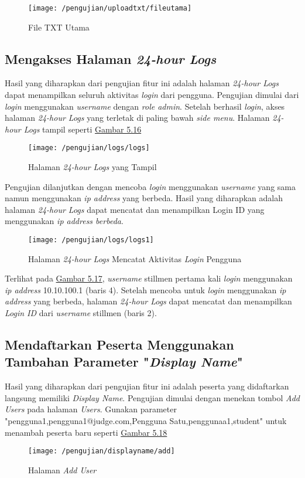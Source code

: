 	\begin{figure}[H]
		\centering  
		\texttt{[image: /pengujian/uploadtxt/fileutama]}  
		\caption[File TXT Utama]{File TXT Utama} 
		\label{fig:fileutama} 
	\end{figure}

	\subsection{Mengakses Halaman \textit{24-hour Logs}}
	Hasil yang diharapkan dari pengujian fitur ini adalah halaman \textit{24-hour Logs} dapat menampilkan seluruh aktivitas \textit{login} dari pengguna. Pengujian dimulai dari \textit{login} menggunakan \textit{username} dengan \textit{role admin}. Setelah berhasil \textit{login}, akses halaman \textit{24-hour Logs} yang terletak di paling bawah \textit{side menu}. Halaman \textit{24-hour Logs} tampil seperti \hyperref[fig:logs]{Gambar 5.16}
	\begin{figure}[H]
		\centering  
		\texttt{[image: /pengujian/logs/logs]}  
		\caption[Halaman \textit{24-hour Logs} yang Tampil]{Halaman \textit{24-hour Logs} yang Tampil} 
		\label{fig:logs} 
	\end{figure}

	Pengujian dilanjutkan dengan mencoba \textit{login} menggunakan \textit{username} yang sama namun menggunakan \textit{ip address} yang berbeda. Hasil yang diharapkan adalah halaman \textit{24-hour Logs} dapat mencatat dan menampilkan Login ID yang menggunakan \textit{ip address berbeda}.
	\begin{figure}[H]
		\centering  
		\texttt{[image: /pengujian/logs/logs1]}  
		\caption[Halaman \textit{24-hour Logs} Mencatat Aktivitas \textit{Login} Pengguna]{Halaman \textit{24-hour Logs} Mencatat Aktivitas \textit{Login} Pengguna} 
		\label{fig:logs1} 
	\end{figure}
	Terlihat pada \hyperref[fig:logs1]{Gambar 5.17}, \textit{username} stillmen pertama kali \textit{login} menggunakan \textit{ip address} 10.10.100.1 (baris 4). Setelah mencoba untuk \textit{login} menggunakan \textit{ip address} yang berbeda, halaman \textit{24-hour Logs} dapat mencatat dan menampilkan \textit{Login ID} dari \textit{username} stillmen (baris 2).
	
	\subsection{Mendaftarkan Peserta Menggunakan Tambahan Parameter "\textit{Display Name}"}
	Hasil yang diharapkan dari pengujian fitur ini adalah peserta yang didaftarkan langsung memiliki \textit{Display Name}. Pengujian dimulai dengan menekan tombol \textit{Add Users} pada halaman \textit{Users}. Gunakan parameter "pengguna1,pengguna1@judge.com,Pengguna Satu,penggunaa1,student" untuk menambah peserta baru seperti \hyperref[fig:useradd]{Gambar 5.18}
	\begin{figure}[H]
		\centering  
		\texttt{[image: /pengujian/displayname/add]}  
		\caption[Halaman \textit{Add User}]{Halaman \textit{Add User}} 
		\label{fig:useradd} 
	\end{figure}

